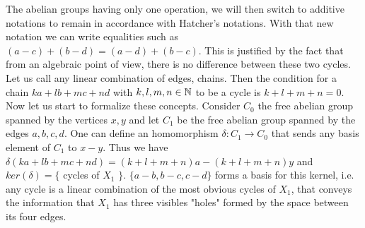 \documentclass[12pt]{article}
\begin{document}
The abelian groups having only one operation, we will then switch to additive notations to remain in accordance with Hatcher's notations. With that new notation we can write equalities such as $(a-c) + (b-d) = (a-d) + (b-c)$. This is justified by the fact that from an algebraic point of view, there is no difference between these two cycles.\\

Let us call any linear combination of edges, chains. Then the condition for a chain $ka + lb + mc + nd$ with $k,l,m,n \in \mathbb{N}$ to be a cycle is $k + l + m + n = 0$.\\

Now let us start to formalize these concepts. Consider $C_0$ the free abelian group spanned by the vertices $x,y$ and let $C_1$ be the free abelian group spanned by the edges $a,b,c,d$. One can define an homomorphism $\delta: C_1 \to C_0$ that sends any basis element of $C_1$ to $x-y$. Thus we have $\delta(ka+lb+mc+nd) = (k+l+m+n)a - (k+l+m+n)y$ and $ker(\delta) = \{$ cycles of $X_1$ $\}$. $\{ a-b, b-c, c-d \}$ forms a basis for this kernel, i.e. any cycle is a linear combination of the most obvious cycles of $X_1$, that conveys the information that $X_1$ has three visibles "holes" formed by the space between its four edges.\\

\begin{center}
\end{center}
\end{document}
